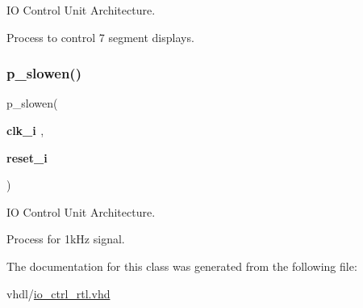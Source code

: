 IO Control Unit Architecture. 

Process to control 7 segment displays. \mbox{\label{classio__ctrl_1_1rtl_ae82c89fe12aec7f3a8a04e832dd5cc0e}} 
\subsubsection{\texorpdfstring{p\+\_\+slowen()}{p\_slowen()}}
{\footnotesize\ttfamily  {\bfseries \textcolor{vhdlchar}{ }} p\+\_\+slowen(\begin{DoxyParamCaption}\item[{}]{{\bfseries \textcolor{vhdlchar}{clk\+\_\+i}\textcolor{vhdlchar}{ }} {\em } ,  }\item[{}]{{\bfseries \textcolor{vhdlchar}{reset\+\_\+i}\textcolor{vhdlchar}{ }} {\em } }\end{DoxyParamCaption})\hspace{0.3cm}{\ttfamily [Process]}}



IO Control Unit Architecture. 

Process for 1k\+Hz signal. 

The documentation for this class was generated from the following file\+:\begin{DoxyCompactItemize}
\item 
vhdl/\hyperlink{io__ctrl__rtl_8vhd}{io\+\_\+ctrl\+\_\+rtl.\+vhd}\end{DoxyCompactItemize}
